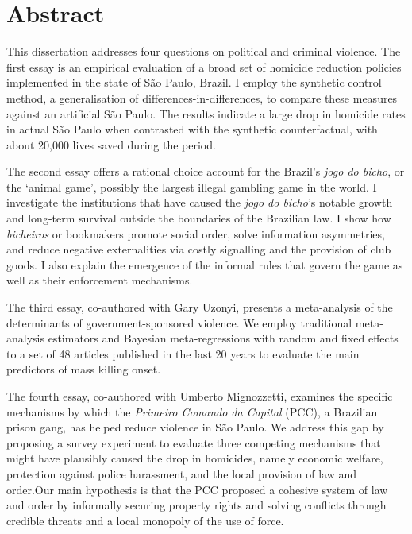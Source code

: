 \documentclass[a4paper,12pt]{report}
\newcommand{\linespacing}{2}
\renewcommand{\baselinestretch}{\linespacing}
\begin{document}
\chapter*{Abstract}
\renewcommand{\baselinestretch}{\linespacing}
\small\normalsize
This dissertation addresses four questions on political and criminal violence. The first essay is an empirical evaluation of a broad set of homicide reduction policies implemented in the state of São Paulo, Brazil. I employ the synthetic control method, a generalisation of differences-in-differences, to compare these measures against an artificial São Paulo. The results indicate a large drop in homicide rates in actual São Paulo when contrasted with the synthetic counterfactual, with about 20,000 lives saved during the period. 

The second essay offers a rational choice account for the Brazil's \textit{jogo do bicho}, or the `animal game', possibly the largest illegal gambling game in the world. I investigate the institutions that have caused the \textit{jogo do bicho}'s notable growth and long-term survival outside the boundaries of the Brazilian law. I show how \textit{bicheiros} or bookmakers promote social order, solve information asymmetries, and reduce negative externalities via costly signalling and the provision of club goods. I also explain the emergence of the informal rules that govern the game as well as their enforcement mechanisms. 

The third essay, co-authored with Gary Uzonyi, presents a meta-analysis of the determinants of government-sponsored violence. We employ traditional meta-analysis estimators and Bayesian meta-regressions with random and fixed effects to a set of 48 articles published in the last 20 years to evaluate the main predictors of mass killing onset. 

The fourth essay, co-authored with Umberto Mignozzetti, examines the specific mechanisms by which the \textit{Primeiro Comando da Capital} (PCC), a Brazilian prison gang,  has helped reduce violence in São Paulo. We address this gap by proposing a survey experiment to evaluate three competing mechanisms that might have plausibly caused the drop in homicides, namely economic welfare, protection against police harassment, and the local provision of law and order.Our main hypothesis is that the PCC proposed a cohesive system of law and order by informally securing property rights and solving conflicts through credible threats and a local monopoly of the use of force.
\end{document}

